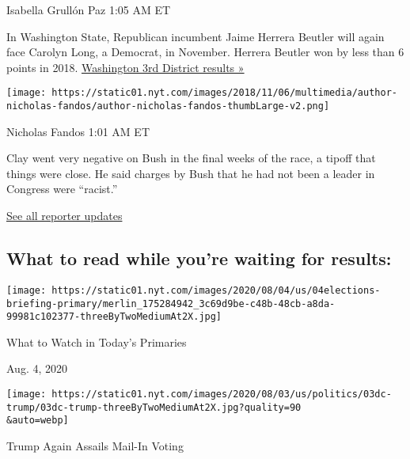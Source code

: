 Isabella Grullón Paz 1:05 AM ET

In Washington State, Republican incumbent Jaime Herrera Beutler will
again face Carolyn Long, a Democrat, in November. Herrera Beutler won by
less than 6 points in 2018.
\href{https://www.nytimes.com/interactive/2020/08/04/us/elections/results-washington-house-district-3-primary-election.html?action=click\&module=ELEX_results\&pgtype=Interactive\&region=ReporterUpdates}{Washington
3rd District results »}

\texttt{[image: https://static01.nyt.com/images/2018/11/06/multimedia/author-nicholas-fandos/author-nicholas-fandos-thumbLarge-v2.png]}

Nicholas Fandos 1:01 AM ET

Clay went very negative on Bush in the final weeks of the race, a tipoff
that things were close. He said charges by Bush that he had not been a
leader in Congress were ``racist.''

\href{https://www.nytimes.com/interactive/2020/08/04/us/elections/live-analysis-arizona-kansas-michigan-missouri-primaries.html?action=click\&module=ELEX_results\&pgtype=Interactive\&region=Component}{See
all reporter updates}

\hypertarget{what-to-read-while-youre-waiting-for-results}{%
\subsection{What to read while you're waiting for
results:}\label{what-to-read-while-youre-waiting-for-results}}

\href{https://www.nytimes.com/2020/08/04/us/elections/primary-election-michigan-arizona-kansas.html?action=click\&module=ELEX_results\&pgtype=Interactive\&region=RelatedCoverage}{}

\texttt{[image: https://static01.nyt.com/images/2020/08/04/us/04elections-briefing-primary/merlin\_175284942\_3c69d9be-c48b-48cb-a8da-99981c102377-threeByTwoMediumAt2X.jpg]}

What to Watch in Today's Primaries

Aug. 4, 2020

\href{https://www.nytimes.com/2020/08/03/us/politics/trump-mail-in-voting.html?action=click\&module=ELEX_results\&pgtype=Interactive\&region=RelatedCoverage}{}

\texttt{[image: https://static01.nyt.com/images/2020/08/03/us/politics/03dc-trump/03dc-trump-threeByTwoMediumAt2X.jpg?quality=90\\\&auto=webp]}

Trump Again Assails Mail-In Voting

